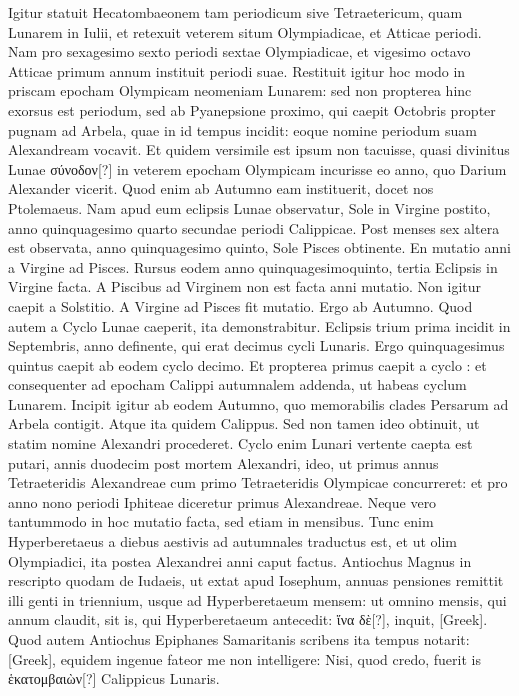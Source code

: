 Igitur statuit Hecatombaeonem tam periodicum
sive Tetraetericum, quam Lunarem in  Iulii, et retexuit veterem
situm Olympiadicae, et Atticae periodi.
Nam pro sexagesimo sexto periodi
sextae Olympiadicae, et vigesimo octavo Atticae primum annum
instituit periodi suae.
Restituit igitur hoc modo in priscam epocham
Olympicam neomeniam Lunarem: sed non propterea hinc exorsus
est periodum, sed ab Pyanepsione proximo, qui caepit  Octobris
propter pugnam ad Arbela, quae in id tempus incidit: eoque nomine
periodum suam Alexandream vocavit.
Et quidem versimile est ipsum
non tacuisse, quasi divinitus Lunae \textgreek{σύνοδον[?]}
 in veterem epocham Olympicam
incurisse eo anno, quo Darium Alexander vicerit.
Quod
enim ab Autumno eam instituerit, docet nos Ptolemaeus.
Nam apud
eum eclipsis Lunae observatur, Sole in Virgine postito, anno quinquagesimo
quarto secundae periodi Calippicae.
Post menses sex altera est
observata, anno quinquagesimo quinto, Sole Pisces obtinente.
En
mutatio anni a Virgine ad Pisces.
Rursus eodem anno quinquagesimoquinto,
tertia Eclipsis in Virgine facta.
A Piscibus ad Virginem
non est facta anni mutatio.
Non igitur caepit a Solstitio.
A Virgine
ad Pisces fit mutatio.
Ergo ab Autumno.
Quod autem a Cyclo Lunae
 caeperit, ita demonstrabitur.
Eclipsis trium prima incidit in
 Septembris, anno  definente,
 qui erat decimus cycli Lunaris.
Ergo quinquagesimus quintus caepit ab eodem cyclo decimo.
Et propterea primus caepit a cyclo : et consequenter
  ad epocham
Calippi autumnalem addenda, ut habeas cyclum Lunarem.
Incipit igitur ab eodem Autumno, quo memorabilis clades Persarum
ad Arbela contigit.
Atque ita quidem Calippus.
Sed non tamen
ideo obtinuit, ut statim nomine Alexandri procederet.
Cyclo
enim Lunari vertente caepta est putari, annis duodecim post mortem
Alexandri, ideo, ut primus annus Tetraeteridis Alexandreae cum primo
Tetraeteridis Olympicae concurreret: et pro anno nono periodi
Iphiteae diceretur primus Alexandreae.
Neque vero tantummodo in
hoc mutatio facta, sed etiam in mensibus.
Tunc enim Hyperberetaeus
a diebus aestivis ad autumnales traductus est, et ut olim Olympiadici,
ita postea Alexandrei anni caput factus.
Antiochus Magnus in
rescripto quodam de Iudaeis, ut extat apud Iosephum, annuas pensiones
remittit illi genti in triennium, usque ad Hyperberetaeum mensem:
ut omnino mensis, qui annum claudit, sit is, qui Hyperberetaeum
antecedit: \textgreek{ἵνα δὲ[?]}, inquit, \textgreek{[Greek]}.
Quod autem Antiochus Epiphanes Samaritanis scribens ita tempus
notarit: \textgreek{[Greek]}, equidem ingenue fateor me non intelligere:
Nisi, quod credo, fuerit is \textgreek{ἑκατομβαιὼν[?]} Calippicus Lunaris.

